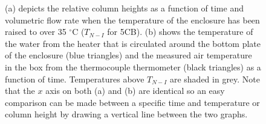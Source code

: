 \begin{figure}
\begin{center}
\end{center}
\caption[Column heights in the isotropic phase (right to left)]{\label{fig:isotropic_right_to_left}(a) depicts the relative column heights as a function of time and volumetric flow rate when the temperature of the enclosure has been raised to over 35 $^{\circ}\text{C}$ ($T_{N-I}$ for 5CB). (b) shows the temperature of the water from the heater that is circulated around the bottom plate of the enclosure (blue triangles) and the measured air temperature in the box from the thermocouple thermometer (black triangles) as a function of time. Temperatures above $T_{N-I}$ are shaded in grey. Note that the $x$ axis on both (a) and (b) are identical so an easy comparison can be made between a specific time and temperature or column height by drawing a vertical line between the two graphs.}
\end{figure}

